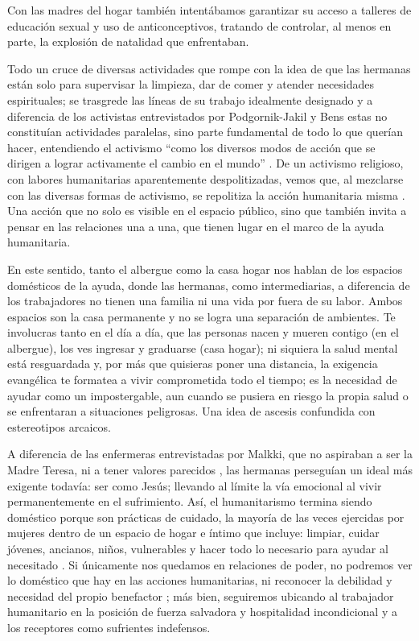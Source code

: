 \documentclass[
  spanish,
  11pt,
  a4paper,
]{scrbook}
\begin{document}
Con las madres del hogar también intentábamos garantizar su acceso a
talleres de educación sexual y uso de anticonceptivos, tratando de
controlar, al menos en parte, la explosión de natalidad que enfrentaban.

Todo un cruce de diversas actividades que rompe con la idea de que las
hermanas están solo para supervisar la limpieza, dar de comer y atender
necesidades espirituales; se trasgrede las líneas de su trabajo
idealmente designado \autocite[310]{PodgornikJakil2021} y a diferencia
de los activistas entrevistados por Podgornik-Jakil y Bens estas no
constituían actividades paralelas, sino parte fundamental de todo lo que
querían hacer, entendiendo el activismo ``como los diversos modos de
acción que se dirigen a lograr activamente el cambio en el mundo''
\autocite[299]{PodgornikJakil2021}. De un activismo religioso, con
labores humanitarias aparentemente despolitizadas, vemos que, al
mezclarse con las diversas formas de activismo, se repolitiza la acción
humanitaria misma \autocite[7]{AgudoSanchiz2023}. Una acción que no solo
es visible en el espacio público, sino que también invita a pensar en
las relaciones una a una, que tienen lugar en el marco de la ayuda
humanitaria.

En este sentido, tanto el albergue como la casa hogar nos hablan de los
espacios domésticos de la ayuda, donde las hermanas, como
intermediarias, a diferencia de los trabajadores no tienen una familia
ni una vida por fuera de su labor. Ambos espacios son la casa permanente
y no se logra una separación de ambientes. Te involucras tanto en el día
a día, que las personas nacen y mueren contigo (en el albergue), los ves
ingresar y graduarse (casa hogar); ni siquiera la salud mental está
resguardada y, por más que quisieras poner una distancia, la exigencia
evangélica te formatea a vivir comprometida todo el tiempo; es la
necesidad de ayudar \autocite[3]{Malkki2015} como un impostergable, aun
cuando se pusiera en riesgo la propia salud o se enfrentaran a
situaciones peligrosas. Una idea de ascesis confundida con estereotipos
arcaicos.

A diferencia de las enfermeras entrevistadas por Malkki, que no
aspiraban a ser la Madre Teresa, ni a tener valores parecidos
\autocite*[30]{Malkki2015}, las hermanas perseguían un ideal más
exigente todavía: ser como Jesús; llevando al límite la vía emocional al
vivir permanentemente en el sufrimiento. Así, el humanitarismo termina
siendo doméstico porque son prácticas de cuidado, la mayoría de las
veces ejercidas por mujeres dentro de un espacio de hogar e íntimo que
incluye: limpiar, cuidar jóvenes, ancianos, niños, vulnerables y hacer
todo lo necesario para ayudar al necesitado \autocite[4]{Malkki2015}. Si
únicamente nos quedamos en relaciones de poder, no podremos ver lo
doméstico que hay en las acciones humanitarias, ni reconocer la
debilidad y necesidad del propio benefactor \autocite[9]{Malkki2015};
más bien, seguiremos ubicando al trabajador humanitario en la posición
de fuerza salvadora y hospitalidad incondicional y a los receptores como
sufrientes indefensos.
\end{document}
